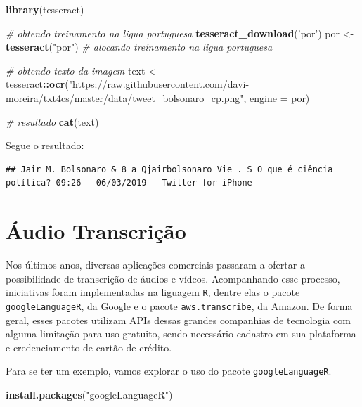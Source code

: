\documentclass[]{book}
\newenvironment{Shaded}{\begin{snugshade}}{\end{snugshade}}
\newcommand{\CommentTok}[1]{\textcolor[rgb]{0.56,0.35,0.01}{\textit{#1}}}
\newcommand{\DataTypeTok}[1]{\textcolor[rgb]{0.13,0.29,0.53}{#1}}
\newcommand{\KeywordTok}[1]{\textcolor[rgb]{0.13,0.29,0.53}{\textbf{#1}}}
\newcommand{\NormalTok}[1]{#1}
\newcommand{\OperatorTok}[1]{\textcolor[rgb]{0.81,0.36,0.00}{\textbf{#1}}}
\newcommand{\StringTok}[1]{\textcolor[rgb]{0.31,0.60,0.02}{#1}}
\begin{document}
\begin{Shaded}
\begin{Highlighting}[]
\KeywordTok{library}\NormalTok{(tesseract)}

\CommentTok{# obtendo treinamento na ligua portuguesa}
\KeywordTok{tesseract_download}\NormalTok{(}\StringTok{'por'}\NormalTok{)}
\NormalTok{por <-}\StringTok{ }\KeywordTok{tesseract}\NormalTok{(}\StringTok{"por"}\NormalTok{) }\CommentTok{# alocando treinamento na ligua portuguesa}

\CommentTok{# obtendo texto da imagem}
\NormalTok{text <-}\StringTok{ }\NormalTok{tesseract}\OperatorTok{::}\KeywordTok{ocr}\NormalTok{(}\StringTok{"https://raw.githubusercontent.com/davi-moreira/txt4cs/master/data/tweet_bolsonaro_cp.png"}\NormalTok{, }\DataTypeTok{engine =}\NormalTok{ por)}

\CommentTok{# resultado}
\KeywordTok{cat}\NormalTok{(text)}
\end{Highlighting}
\end{Shaded}

Segue o resultado:

\begin{verbatim}
## Jair M. Bolsonaro & 8 a Qjairbolsonaro Vie . S O que é ciência política? 09:26 - 06/03/2019 - Twitter for iPhone
\end{verbatim}

\hypertarget{uxe1udio-transcriuxe7uxe3o}{%
\section{Áudio Transcrição}\label{uxe1udio-transcriuxe7uxe3o}}

Nos últimos anos, diversas aplicações comerciais passaram a ofertar a possibilidade
de transcrição de áudios e vídeos. Acompanhando esse processo, iniciativas foram
implementadas na liguagem \texttt{R}, dentre elas o pacote \href{https://cran.r-project.org/web/packages/googleLanguageR/index.html}{\texttt{googleLanguageR}},
da Google e o pacote \href{https://cran.r-project.org/web/packages/aws.transcribe/index.html}{\texttt{aws.transcribe}}, da Amazon.
De forma geral, esses pacotes utilizam APIs dessas grandes companhias de tecnologia
com alguma limitação para uso gratuito, sendo necessário cadastro em sua plataforma e
credenciamento de cartão de crédito.

Para se ter um exemplo, vamos explorar o uso do pacote \texttt{googleLanguageR}.

\begin{Shaded}
\begin{Highlighting}[]
\KeywordTok{install.packages}\NormalTok{(}\StringTok{"googleLanguageR"}\NormalTok{)}
\end{Highlighting}
\end{Shaded}
\end{document}
